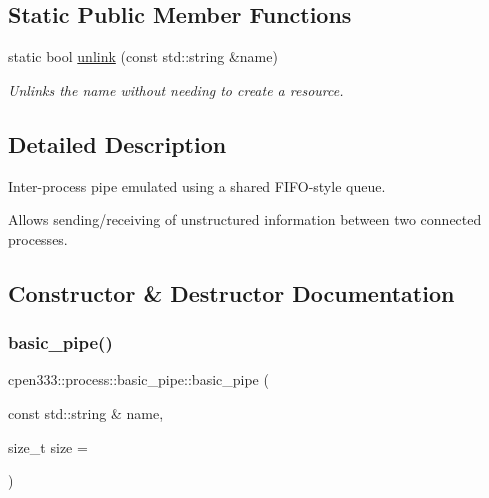 \subsection*{Static Public Member Functions}
\begin{DoxyCompactItemize}
\item 
static bool \hyperlink{classcpen333_1_1process_1_1basic__pipe_afef75c200701b049e58942210f0d6030}{unlink} (const std\+::string \&name)
\begin{DoxyCompactList}\small\item\em Unlinks the name without needing to create a resource. \end{DoxyCompactList}\end{DoxyCompactItemize}


\subsection{Detailed Description}
Inter-\/process pipe emulated using a shared F\+I\+F\+O-\/style queue. 

Allows sending/receiving of unstructured information between two connected processes. 

\subsection{Constructor \& Destructor Documentation}
\mbox{\label{classcpen333_1_1process_1_1basic__pipe_af61543ec6433ad27cac0433a138199b7}} 
\subsubsection{\texorpdfstring{basic\+\_\+pipe()}{basic\_pipe()}}
{\footnotesize\ttfamily cpen333\+::process\+::basic\+\_\+pipe\+::basic\+\_\+pipe (\begin{DoxyParamCaption}\item[{const std\+::string \&}]{name,  }\item[{size\+\_\+t}]{size = {} }\end{DoxyParamCaption})\hspace{0.3cm}{\ttfamily [inline]}}



